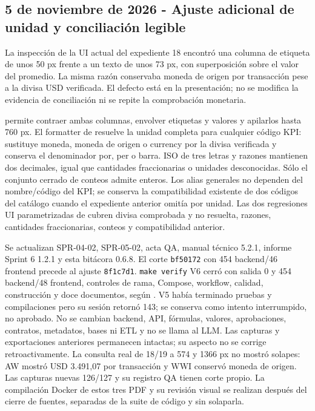 \documentclass[11pt,letterpaper]{article}
\newcommand{\file}[1]{\texttt{#1}}
\begin{document}
\subsection{5 de noviembre de 2026 - Ajuste adicional de unidad y conciliación legible}

La inspección de la UI actual del expediente 18 encontró una columna de etiqueta
de unos 50 px frente a un texto de unos 73 px, con superposición sobre el valor del
promedio. La misma razón conservaba moneda de origen por transacción pese a la
divisa USD verificada. El defecto está en la presentación; no se modifica la
evidencia de conciliación ni se repite la comprobación monetaria.

 permite contraer ambas columnas, envolver etiquetas
y valores y apilarlos hasta 760 px. El formatter de 
resuelve la unidad completa para cualquier código KPI: sustituye moneda, moneda
de origen o currency por la divisa verificada y conserva el denominador por, per
o barra. ISO de tres letras y razones mantienen dos decimales, igual que
cantidades fraccionarias o unidades desconocidas. Sólo el conjunto cerrado de
conteos admite enteros. Los alias generales no dependen del nombre/código del KPI;
se conserva la compatibilidad existente de dos códigos del catálogo cuando el
expediente anterior omitía por unidad. Las dos regresiones UI parametrizadas de
 cubren divisa comprobada y no resuelta, razones,
cantidades fraccionarias, conteos y compatibilidad anterior.

Se actualizan SPR-04-02, SPR-05-02, acta QA, manual técnico 5.2.1, informe Sprint 6
1.2.1 y esta bitácora 0.6.8. El corte \file{bf50172} con 454 backend/46 frontend
precede al ajuste \file{8f1c7d1}. \file{make verify} V6 cerró con salida 0 y
454 backend/48 frontend, controles de rama, Compose, workflow, calidad, construcción
y doce documentos, según .
V5 había terminado pruebas y compilaciones pero su sesión retornó 143; se conserva
como intento interrumpido, no aprobado. No se cambian backend, API, fórmulas, valores, aprobaciones, contratos,
metadatos, bases ni ETL y no se llama al LLM. Las capturas y exportaciones anteriores
permanecen intactas; su aspecto no se corrige retroactivamente. La consulta real de
18/19 a 574 y 1366 px no mostró solapes: AW mostró USD 3.491,07 por transacción y
WWI conservó moneda de origen. Las capturas nuevas 126/127 y su registro QA tienen
corte propio. La compilación Docker de estos tres PDF y su revisión visual se
realizan después del cierre de fuentes, separadas de la suite de código y sin solaparla.
\end{document}
